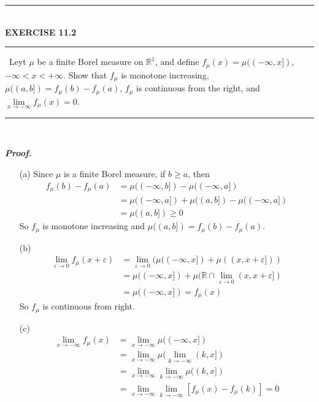 \documentclass[a4paper,11pt]{article}
\begin{document}
	\begin{flushleft}
		\rule[-0.5ex]{17cm}{2pt}\\
			\textbf{EXERCISE 11.2}\\
		\rule[1.5ex]{17cm}{0.5pt}\
			Leyt $\mu$ be a finite Borel measure on $\mathbb{R}^1$, and define $f_\mu (x) = \mu((-\infty,x])$, $-\infty < x < +\infty$. Show that $f_\mu$ is monotone increasing, $\mu((a,b]) = f_\mu (b) - f_\mu (a)$, $f_\mu$ is continuous from the right, and $\underset{x \to -\infty}{\lim} f_\mu (x) = 0$.
		\rule[1.0ex]{17cm}{0.5pt}\
	\end{flushleft}
	\textit{\textbf {Proof.}}
	\begin{enumerate}
		\item[(a)]
			Since $\mu$ is a finite Borel measure, if $b \geq a$, then
				$$\begin{aligned}
				f_\mu(b) - f_\mu(a)
				&= \mu((-\infty,b]) - \mu((-\infty,a])\\
				&= \mu((-\infty,a]) + \mu((a,b]) - \mu((-\infty,a])\\
				&= \mu((a,b]) \geq 0
				\end{aligned}$$
			So $f_\mu$ is monotone increasing and $\mu((a,b]) = f_\mu(b) - f_\mu(a)$.\\

		\item[(b)]
				$$\begin{aligned}
					\underset{\varepsilon \to 0}{\lim} f_\mu (x+\varepsilon)
					&= \underset{\varepsilon \to 0}{\lim} (\mu((-\infty,x]) + \mu((x,x+\varepsilon]))\\
					&= \mu((-\infty,x]) + \mu(\mathbb{R} \cap \underset{\varepsilon \to 0}{\lim}(x,x+\varepsilon])\\
					&= \mu((-\infty,x])
					= f_\mu (x)
				\end{aligned}$$
			So $f_\mu$ is continuous from right.\\

		\item[(c)]
				$$\begin{aligned}
					\underset{x \to -\infty}{\lim} f_\mu (x)
					&= \underset{x \to -\infty}{\lim} \mu((-\infty,x])\\
					&= \underset{x \to -\infty}{\lim} \mu(\underset{k \to -\infty}{\lim}(k,x])\\
					&= \underset{x \to -\infty}{\lim} \underset{k \to -\infty}{\lim} \mu((k,x])\\
					&= \underset{x \to -\infty}{\lim} \underset{k \to -\infty}{\lim} [f_\mu(x) - f_\mu(k)] = 0
				\end{aligned}$$
	\end{enumerate}
\end{document}
